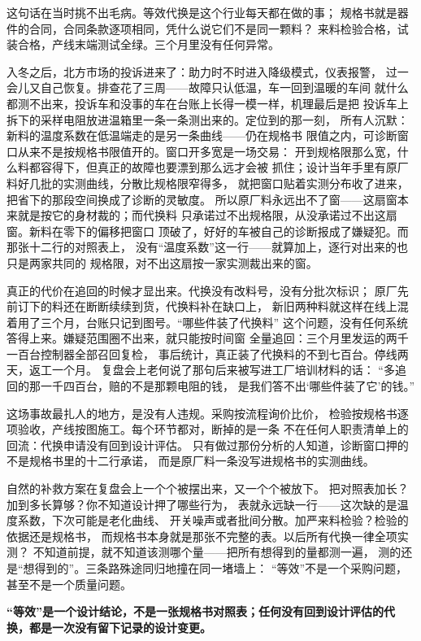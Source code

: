 这句话在当时挑不出毛病。等效代换是这个行业每天都在做的事；
规格书就是器件的合同，合同条款逐项相同，凭什么说它们不是同一颗料？
来料检验合格，试装合格，产线末端测试全绿。三个月里没有任何异常。

入冬之后，北方市场的投诉进来了：助力时不时进入降级模式，仪表报警，
过一会儿又自己恢复。排查花了三周——故障只认低温，车一回到温暖的车间
就什么都测不出来，投诉车和没事的车在台账上长得一模一样，机理最后是把
投诉车上拆下的采样电阻放进温箱里一条一条测出来的。定位到的那一刻，
所有人沉默：新料的温度系数在低温端走的是另一条曲线——仍在规格书
限值之内，可诊断窗口从来不是按规格书限值开的。窗口开多宽是一场交易：
开到规格限那么宽，什么料都容得下，但真正的故障也要漂到那么远才会被
抓住；设计当年手里有原厂料好几批的实测曲线，分散比规格限窄得多，
就把窗口贴着实测分布收了进来，把省下的那段空间换成了诊断的灵敏度。
所以原厂料永远出不了窗——这扇窗本来就是按它的身材裁的；而代换料
只承诺过不出规格限，从没承诺过不出这扇窗。新料在零下的偏移把窗口
顶破了，好好的车被自己的诊断报成了嫌疑犯。而那张十二行的对照表上，
没有“温度系数”这一行——就算加上，逐行对出来的也只是两家共同的
规格限，对不出这扇按一家实测裁出来的窗。

真正的代价在追回的时候才显出来。代换没有改料号，没有分批次标识；
原厂先前订下的料还在断断续续到货，代换料补在缺口上，
新旧两种料就这样在线上混着用了三个月，台账只记到图号。“哪些件装了代换料”
这个问题，没有任何系统答得上来。嫌疑范围圈不出来，就只能按时间窗
全量追回：三个月里发运的两千一百台控制器全部召回复检，
事后统计，真正装了代换料的不到七百台。停线两天，返工一个月。
复盘会上老何说了那句后来被写进工厂培训材料的话：
“多追回的那一千四百台，赔的不是那颗电阻的钱，
是我们答不出‘哪些件装了它’的钱。”

这场事故最扎人的地方，是没有人违规。采购按流程询价比价，
检验按规格书逐项验收，产线按图施工。每个环节都对，断掉的是一条
不在任何人职责清单上的回流：代换申请没有回到设计评估。
只有做过那份分析的人知道，诊断窗口押的不是规格书里的十二行承诺，
而是原厂料一条没写进规格书的实测曲线。

自然的补救方案在复盘会上一个个被摆出来，又一个个被放下。
把对照表加长？加到多长算够？你不知道设计押了哪些行为，
表就永远缺一行——这次缺的是温度系数，下次可能是老化曲线、
开关噪声或者批间分散。加严来料检验？检验的依据还是规格书，
而规格书本身就是那张不完整的表。以后所有代换一律全项实测？
不知道前提，就不知道该测哪个量——把所有想得到的量都测一遍，
测的还是“想得到的”。三条路殊途同归地撞在同一堵墙上：
“等效”不是一个采购问题，甚至不是一个质量问题。

\textbf{“等效”是一个设计结论，不是一张规格书对照表；任何没有回到设计评估的代换，都是一次没有留下记录的设计变更。}


